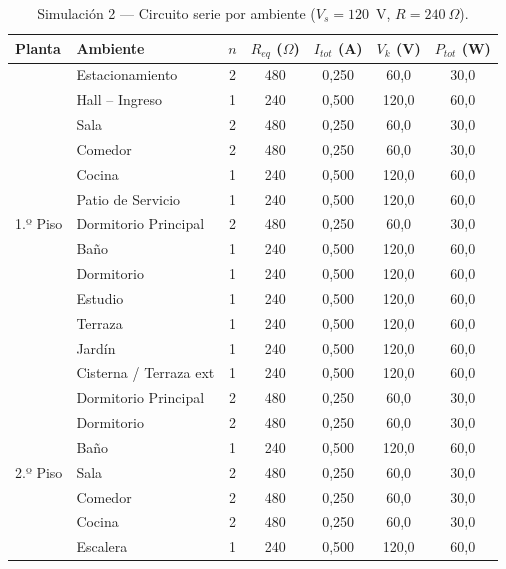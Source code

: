 \begin{table}[H]
\centering
\caption{Simulación 2 — Circuito serie por ambiente ($V_s = 120$~V, $R = 240~\Omega$).}
\label{tab:sim_serie}
\begin{tabular}{llccccc}
\toprule
\textbf{Planta} & \textbf{Ambiente} & \textbf{$n$} & \textbf{$R_{eq}$ ($\Omega$)} & \textbf{$I_{tot}$ (A)} & \textbf{$V_k$ (V)} & \textbf{$P_{tot}$ (W)} \\
\midrule
\multirow{13}{*}{1.º Piso}
 & Estacionamiento        & 2 &  480 & 0{,}250 &  60{,}0 & 30{,}0 \\
 & Hall – Ingreso         & 1 &  240 & 0{,}500 & 120{,}0 & 60{,}0 \\
 & Sala                   & 2 &  480 & 0{,}250 &  60{,}0 & 30{,}0 \\
 & Comedor                & 2 &  480 & 0{,}250 &  60{,}0 & 30{,}0 \\
 & Cocina                 & 1 &  240 & 0{,}500 & 120{,}0 & 60{,}0 \\
 & Patio de Servicio      & 1 &  240 & 0{,}500 & 120{,}0 & 60{,}0 \\
 & Dormitorio Principal   & 2 &  480 & 0{,}250 &  60{,}0 & 30{,}0 \\
 & Baño                   & 1 &  240 & 0{,}500 & 120{,}0 & 60{,}0 \\
 & Dormitorio             & 1 &  240 & 0{,}500 & 120{,}0 & 60{,}0 \\
 & Estudio                & 1 &  240 & 0{,}500 & 120{,}0 & 60{,}0 \\
 & Terraza                & 1 &  240 & 0{,}500 & 120{,}0 & 60{,}0 \\
 & Jardín                 & 1 &  240 & 0{,}500 & 120{,}0 & 60{,}0 \\
 & Cisterna / Terraza ext & 1 &  240 & 0{,}500 & 120{,}0 & 60{,}0 \\
\midrule
\multirow{8}{*}{2.º Piso}
 & Dormitorio Principal   & 2 &  480 & 0{,}250 &  60{,}0 & 30{,}0 \\
 & Dormitorio             & 2 &  480 & 0{,}250 &  60{,}0 & 30{,}0 \\
 & Baño                   & 1 &  240 & 0{,}500 & 120{,}0 & 60{,}0 \\
 & Sala                   & 2 &  480 & 0{,}250 &  60{,}0 & 30{,}0 \\
 & Comedor                & 2 &  480 & 0{,}250 &  60{,}0 & 30{,}0 \\
 & Cocina                 & 2 &  480 & 0{,}250 &  60{,}0 & 30{,}0 \\
 & Escalera               & 1 &  240 & 0{,}500 & 120{,}0 & 60{,}0 \\

\end{tabular}
\end{table}
